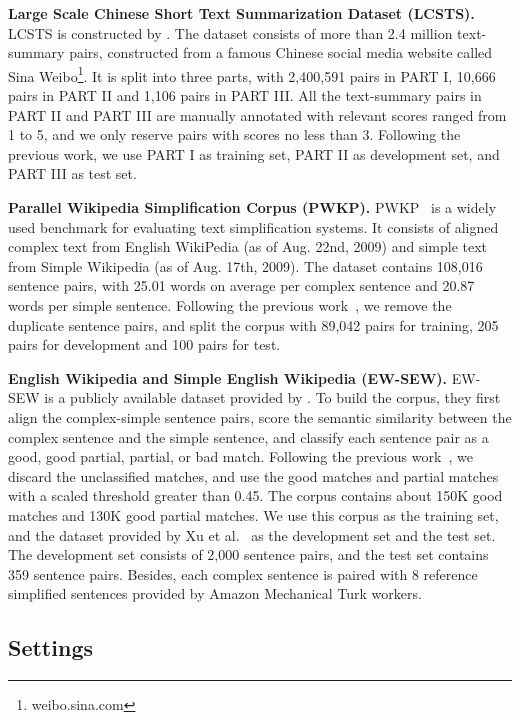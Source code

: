\documentclass{clv3}
\begin{document}
\begin{CJK*}{UTF8}{gbsn}
\textbf{Large Scale Chinese Short Text Summarization Dataset (LCSTS).} LCSTS is constructed by . The dataset consists of more than 2.4 million text-summary pairs, constructed from a famous Chinese social media website called Sina Weibo\footnote{weibo.sina.com}. It is split into three parts, with 2,400,591 pairs in PART I, 10,666 pairs in PART II and 1,106 pairs in PART III. All the text-summary pairs in PART II and PART III are manually annotated with relevant scores ranged from 1 to 5, and we only reserve pairs with scores no less than 3. Following the previous work, we use PART I as training set, PART II as development set, and PART III as test set.


\textbf{Parallel Wikipedia Simplification Corpus (PWKP).} PWKP~\cite{ZhuEA2010} is a widely used benchmark for evaluating text simplification systems. It consists of aligned complex text from English WikiPedia (as of Aug. 22nd, 2009) and simple text from Simple Wikipedia (as of Aug. 17th, 2009). The dataset contains 108,016 sentence pairs, with 25.01 words on average per complex sentence and 20.87 words per simple sentence. Following the previous work~\cite{ZhangEA2017}, we remove the duplicate sentence pairs, and split the corpus with 89,042 pairs for training, 205 pairs for development and 100 pairs for test.

\textbf{English Wikipedia and Simple English Wikipedia (EW-SEW).} EW-SEW is a publicly available dataset provided by . To build the corpus, they first align the complex-simple sentence pairs, score the semantic similarity between the complex sentence and the simple sentence, and classify each sentence pair as a good, good partial, partial, or bad match. Following the previous work~\cite{NisioiEA2017}, we discard the unclassified matches, and use the good matches and partial matches with a scaled threshold greater than 0.45. The corpus contains about 150K good matches and 130K good partial matches. We use this corpus as the training set, and the dataset provided by Xu et al.~\cite{XuEA2016} as the development set and the test set. The development set consists of 2,000 sentence pairs, and the test set contains 359 sentence pairs. Besides, each complex sentence is paired with 8 reference simplified sentences provided by Amazon Mechanical Turk workers.

\subsection{Settings}


\end{CJK*}
\end{document}
